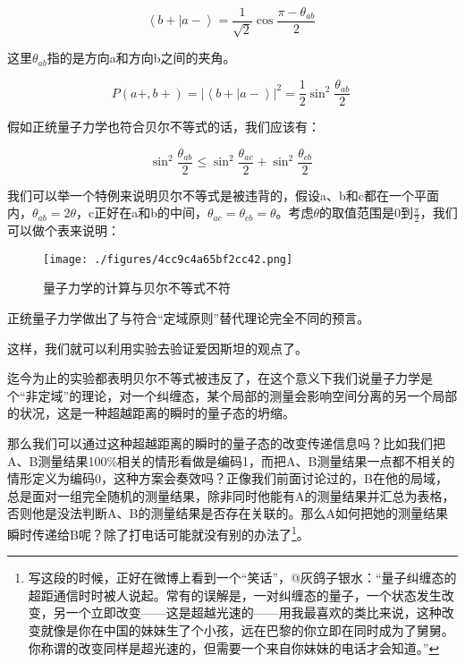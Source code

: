 \begin{equation}
\left\langle {b+} | {a-} \right\rangle = \frac{1}{\sqrt{2}} \cos \frac{\pi - \theta_{ab}}{2}~
\end{equation}

这里$\theta_{ab}$指的是方向a和方向b之间的夹角。

\begin{equation}
P(a+, b+) = \left| {\left\langle {b+} | {a-} \right\rangle} \right|^2 = \frac{1}{2} \sin^2 \frac{\theta_{ab}}{2}~
\end{equation}

假如正统量子力学也符合贝尔不等式的话，我们应该有：

\begin{equation}
\sin^2 \frac{\theta_{ab}}{2} \le \sin^2 \frac{\theta_{ac}}{2} + \sin^2 \frac{\theta_{cb}}{2}~
\end{equation}

我们可以举一个特例来说明贝尔不等式是被违背的，假设a、b和c都在一个平面内，$\theta_{ab} = 2 \theta$，c正好在a和b的中间，$\theta_{ac} = \theta_{cb} = \theta$。考虑$\theta$的取值范围是0到$\frac{\pi}{2}$，我们可以做个表来说明：

\begin{figure}[ht]
\centering
\texttt{[image: ./figures/4cc9c4a65bf2cc42.png]}
\caption{量⼦⼒学的计算与贝尔不等式不符} \label{fig_QMPre3_10}
\end{figure}

正统量子力学做出了与符合“定域原则”替代理论完全不同的预言。

这样，我们就可以利用实验去验证爱因斯坦的观点了。

迄今为止的实验都表明贝尔不等式被违反了，在这个意义下我们说量子力学是个“非定域”的理论，对一个纠缠态，某个局部的测量会影响空间分离的另一个局部的状况，这是一种超越距离的瞬时的量子态的坍缩。

那么我们可以通过这种超越距离的瞬时的量子态的改变传递信息吗？比如我们把A、B测量结果100\%相关的情形看做是编码1，而把A、B测量结果一点都不相关的情形定义为编码0，这种方案会奏效吗？正像我们前面讨论过的，B在他的局域，总是面对一组完全随机的测量结果，除非同时他能有A的测量结果并汇总为表格，否则他是没法判断A、B的测量结果是否存在关联的。那么A如何把她的测量结果瞬时传递给B呢？除了打电话可能就没有别的办法了\footnote{写这段的时候，正好在微博上看到一个“笑话”，@灰鸽子银水：“量子纠缠态的超距通信时时被人说起。常有的误解是，一对纠缠态的量子，一个状态发生改变，另一个立即改变——这是超越光速的——用我最喜欢的类比来说，这种改变就像是你在中国的妹妹生了个小孩，远在巴黎的你立即在同时成为了舅舅。你称谓的改变同样是超光速的，但需要一个来自你妹妹的电话才会知道。”}。

